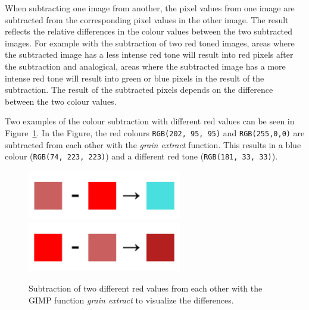 \documentclass[../MasterThesis.tex]{subfiles}
\begin{document}
When subtracting one image from another, the pixel values from one image are subtracted from the corresponding pixel values in the other image. 
The result reflects the relative differences in the colour values between the two subtracted images. For example with the subtraction of two red toned images, areas where the subtracted image has a less intense red tone will result into red pixels after the subtraction and analogical, areas where the subtracted image has a more intense red tone will result into green or blue pixels in the result of the subtraction. The result of the subtracted pixels depends on the difference between the two colour values.

Two examples of the colour subtraction with different red values can be seen in Figure~\ref{figure:neonminuslight}. In the Figure, the red colours \texttt{RGB(202, 95, 95)} and \texttt{RGB(255,0,0)} are subtracted from each other with the \textit{grain extract} function. This results in a blue colour (\texttt{RGB(74, 223, 223)}) and a different red tone (\texttt{RGB(181, 33, 33)}). 






\begin{figure}[H]
	
	\centering
	
	\includegraphics[width=0.6\textwidth]{lightMINUSneon.png}
	\includegraphics[width=0.6\textwidth]{neonMINUSlight.png}
	
	\caption[Colour subtraction with the GIMP function \textit{grain extract}.]{Subtraction of two different red values from each other with the GIMP function \textit{grain extract} to visualize the differences.}
	\label{figure:neonminuslight}
	
\end{figure}
\end{document}
